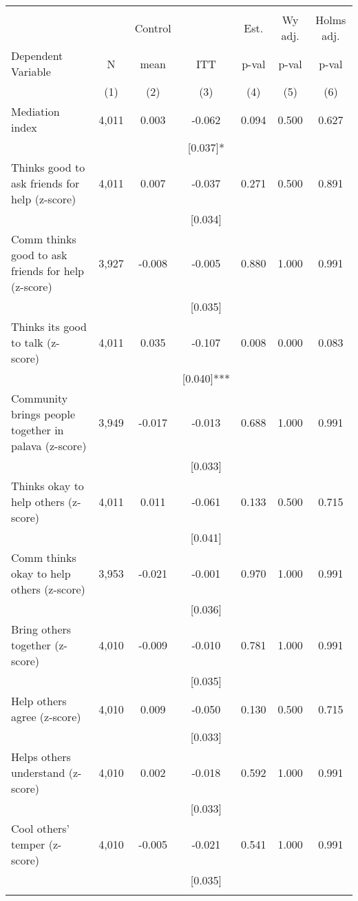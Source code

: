\begin{tabular}{lcccccc}
\hline \noalign{\smallskip} &  &  &  &  &  & \\
 &  & Control &  & Est. & Wy adj. & Holms adj.\\
Dependent Variable & N & mean & ITT & p-val & p-val & p-val\\
 & (1) & (2) & (3) & (4) & (5) & (6)\\
\noalign{\smallskip}\hline \noalign{\smallskip}\quad Mediation index & 4,011 & 0.003 & -0.062 & 0.094 & 0.500 & 0.627\\
 &  &  & [0.037]* &  &  & \\
\quad Thinks good to ask friends for help (z-score) & 4,011 & 0.007 & -0.037 & 0.271 & 0.500 & 0.891\\
 &  &  & [0.034] &  &  & \\
\quad Comm thinks good to ask friends for help (z-score) & 3,927 & -0.008 & -0.005 & 0.880 & 1.000 & 0.991\\
 &  &  & [0.035] &  &  & \\
\quad Thinks its good to talk (z-score) & 4,011 & 0.035 & -0.107 & 0.008 & 0.000 & 0.083\\
 &  &  & [0.040]*** &  &  & \\
\quad Community brings people together in palava (z-score) & 3,949 & -0.017 & -0.013 & 0.688 & 1.000 & 0.991\\
 &  &  & [0.033] &  &  & \\
\quad Thinks okay to help others (z-score) & 4,011 & 0.011 & -0.061 & 0.133 & 0.500 & 0.715\\
 &  &  & [0.041] &  &  & \\
\quad Comm thinks okay to help others (z-score) & 3,953 & -0.021 & -0.001 & 0.970 & 1.000 & 0.991\\
 &  &  & [0.036] &  &  & \\
\quad Bring others together (z-score) & 4,010 & -0.009 & -0.010 & 0.781 & 1.000 & 0.991\\
 &  &  & [0.035] &  &  & \\
\quad Help others agree (z-score) & 4,010 & 0.009 & -0.050 & 0.130 & 0.500 & 0.715\\
 &  &  & [0.033] &  &  & \\
\quad Helps others understand (z-score) & 4,010 & 0.002 & -0.018 & 0.592 & 1.000 & 0.991\\
 &  &  & [0.033] &  &  & \\
\quad Cool others' temper (z-score) & 4,010 & -0.005 & -0.021 & 0.541 & 1.000 & 0.991\\
 &  &  & [0.035] &  &  & \\
\noalign{\smallskip}\hline\end{tabular}
